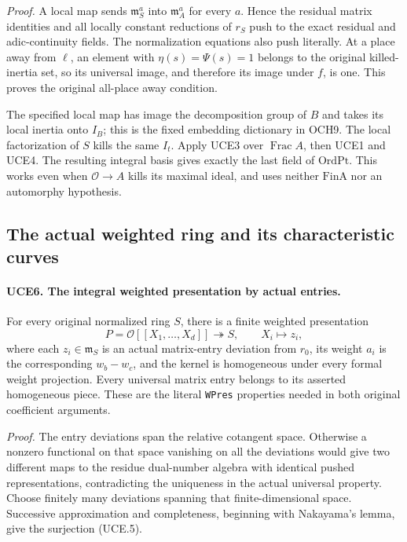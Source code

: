 \emph{Proof.}
A local map sends \(\mathfrak m_S^a\) into
\(\mathfrak m_A^a\) for every \(a\).  Hence the residual matrix
identities and all locally constant reductions of \(r_S\) push
to the exact residual and adic-continuity fields.  The normalization
equations also push literally.
At a place away from \(\ell\), an element with
\(\eta(s)=\Psi(s)=1\) belongs to the original killed-inertia
set, so its universal image, and therefore its image under \(f\),
is one.  This proves the original all-place away condition.

The specified local map has image the decomposition group of \(B\)
and takes its local inertia onto \(I_B\); this is the fixed
embedding dictionary in OCH9.  The local factorization of \(S\)
kills the same \(I_t\).  Apply UCE3 over \(\operatorname{Frac}A\),
then UCE1 and UCE4.  The resulting integral basis gives exactly
the last field of \(\mathrm{OrdPt}\).  This works even when
\(\mathcal O\to A\) kills its maximal ideal, and uses neither
\(\mathrm{FinA}\) nor an automorphy hypothesis.

\subsection{The actual weighted ring and its characteristic curves}

\paragraph{UCE6. The integral weighted presentation by actual entries.}
\label{claim:UCE6}
For every original normalized ring \(S\), there is a finite
weighted presentation
\[
 P=\mathcal O[[X_1,\ldots,X_d]]\twoheadrightarrow S,
 \qquad X_i\longmapsto z_i,
 \tag{UCE.5}
\]
where each \(z_i\in\mathfrak m_S\) is an actual matrix-entry
deviation from \(r_0\), its weight \(a_i\) is the corresponding
\(w_b-w_c\), and the kernel is homogeneous under every formal
weight projection.  Every universal matrix entry belongs to its
asserted homogeneous piece.  These are the literal \texttt{WPres}
properties needed in both original coefficient arguments.

\emph{Proof.}
The entry deviations span the relative cotangent space.  Otherwise
a nonzero functional on that space vanishing on all the deviations
would give two different maps to the residue dual-number algebra
with identical pushed representations, contradicting the uniqueness
in the actual universal property.  Choose finitely many deviations
spanning that finite-dimensional space.  Successive approximation
and completeness, beginning with Nakayama's lemma, give the
surjection (UCE.5).

